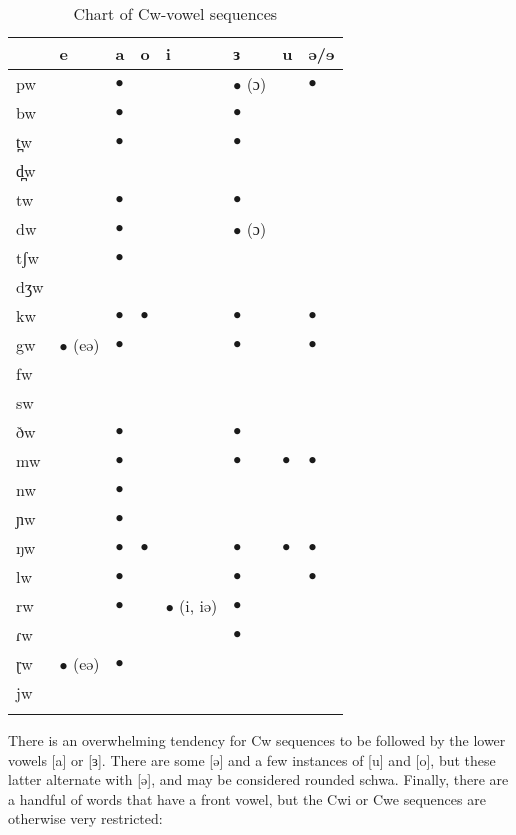 \begin{table}
\caption{Chart of Cw-vowel sequences}
\label{tab:ch2:10}
\begin{tabular}[t]{p{1cm}p{1cm}p{1cm}p{1cm}p{1.25cm}p{1cm}p{1cm}p{1cm}}
\lsptoprule

	&e		&a	&o	&i		&ɜ	&u	&ə/ɘ\\
\midrule
pw	&		&$\bullet$	&	&		&$\bullet$ (ɔ)&		&$\bullet$\\
bw	&		&$\bullet$	&	&		&$\bullet$	\\	
t̪w	&		&$\bullet$	&	&		&$\bullet$\\		
d̪w	&		&	&	&		\\
tw	&		&$\bullet$	&	&		&$\bullet$		\\
dw	&		&$\bullet$	&	&		&$\bullet$ (ɔ)\\		
tʃw	&		&$\bullet$	&	&		\\	
dʒw	&						\\
kw	&		&$\bullet$	&$\bullet$	&		&$\bullet$	&	&$\bullet$\\
gw	&$\bullet$ (eə)	&$\bullet$	&	&		&$\bullet$	&	&$\bullet$\\
fw	&						\\
sw	&						\\
ðw	&		&$\bullet$	&	&		&$\bullet$		\\
mw	&		&$\bullet$	&	&		&$\bullet$	&$\bullet$	&$\bullet$\\
nw	&		&$\bullet$	&	&			\\
ɲw	&		&$\bullet$	&	&			\\
ŋw	&		&$\bullet$	&$\bullet$	&		&$\bullet$	&$\bullet$	&$\bullet$\\
lw	&		&$\bullet$	&	&		&$\bullet$	&	&$\bullet$\\
rw	&		&$\bullet$	&	&$\bullet$ (i, iə)	&$\bullet$		\\
ɾw	&		&	&	&		&$\bullet$		\\
{ɽw}	&$\bullet$ (eə)	&$\bullet$				\\
jw \\
\lspbottomrule
\end{tabular}
\end{table}					

There is an overwhelming tendency for Cw sequences to be followed by the lower vowels [a] or [ɜ]. There are some [ə] and a few instances of [u] and [o], but these latter alternate with [ə], and may be considered rounded schwa. Finally, there are a handful of words that have a front vowel, but the Cwi or Cwe sequences are otherwise very restricted:

